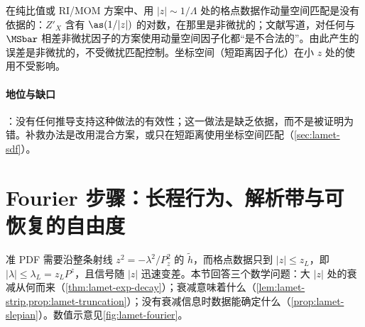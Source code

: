 \begin{remark}\label{rem:lamet-ratio-large-z}
在纯比值或 RI/MOM 方案中、用 $|z|\sim1/\Lambda$ 处的格点数据作动量空间匹配是没有依据的：$Z'_X$ 含有 $\as(1/|z|)$ 的对数，在那里是非微扰的；文献\cite{JiEtAl2021}写道，对任何与 $\MSbar$ 相差非微扰因子的方案使用动量空间因子化都“是不合法的”。由此产生的误差是非微扰的，不受微扰匹配控制。坐标空间（短距离因子化）在小 $z$ 处的使用不受影响。
\end{remark}

\paragraph{地位与缺口}
\tagC：没有任何推导支持这种做法的有效性；这一做法是缺乏依据，而不是被证明为错。补救办法是改用混合方案，或只在短距离使用坐标空间匹配（\cref{sec:lamet-sdf}）。

\section{Fourier 步骤：长程行为、解析带与可恢复的自由度}\label{sec:lamet-fourier}

准 PDF 需要沿整条射线 $z^2=-\lambda^2/P_z^2$ 的 $\tilde h$，而格点数据只到 $|z|\le z_L$，即 $|\lambda|\le\lambda_L=z_LP^z$，且信号随 $|z|$ 迅速变差。本节回答三个数学问题：大 $|z|$ 处的衰减从何而来（\cref{thm:lamet-exp-decay}）；衰减意味着什么（\cref{lem:lamet-strip,prop:lamet-truncation}）；没有衰减信息时数据能确定什么（\cref{prop:lamet-slepian}）。数值示意见\cref{fig:lamet-fourier}。

